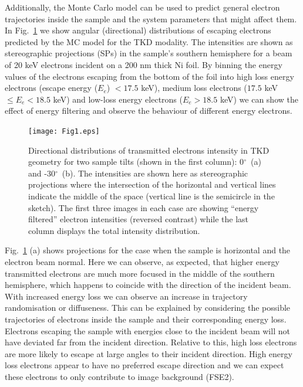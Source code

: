 Additionally, the Monte Carlo model can be used to predict general electron trajectories inside the sample and the system parameters that might affect them. In Fig.~\ref{fig:SP_TKD} we show angular (directional) distributions of escaping electrons predicted by the MC model for the TKD modality. The intensities are shown as stereographic projections (SPs) in the sample's southern hemisphere for a beam of 20 keV electrons incident on a 200 nm thick Ni foil. By binning the energy values of the electrons escaping from the bottom of the foil into high loss energy electrons (escape energy ($E_e$) $<17.5$ keV), medium loss electrons ($17.5$ keV $\leqslant E_e < 18.5$ keV) and low-loss energy electrons ($E_e>18.5$ keV) we can show the effect of energy filtering and observe the behaviour of different energy electrons. 



\begin{figure}[ht]
\centering\leavevmode
\texttt{[image: Fig1.eps]} %
\caption[Directional distributions of transmitted electrons intensity in TKD geometry.]{Directional distributions of transmitted electrons intensity in TKD geometry for two sample tilts (shown in the first column): 0$^{\circ}$~(a) and -30$^{\circ}$~(b). The intensities are shown here as stereographic projections where the intersection of the horizontal and vertical lines indicate the middle of the space (vertical line is the semicircle in the sketch). The first three images in each case are showing  ``energy filtered'' electron intensities (reversed contrast) while the last column displays the total intensity distribution. } 
\label{fig:SP_TKD}
\end{figure}


Fig.~\ref{fig:SP_TKD} (a) shows projections for the case when the sample is horizontal and the electron beam normal. Here we can observe, as expected, that higher energy transmitted electrons are much more focused in the middle of the southern hemisphere, which happens to coincide with the direction of the incident beam. With increased energy loss we can observe an increase in trajectory randomisation or diffuseness. This can be explained by considering the possible trajectories of electrons inside the sample and their corresponding energy loss. Electrons escaping the sample with energies close to the incident beam will not have deviated far from the incident direction. Relative to this, high loss electrons are more likely to escape at large angles to their incident direction. High energy loss electrons appear to have no preferred escape direction and we can expect these electrons to only contribute to image background (FSE2). 

